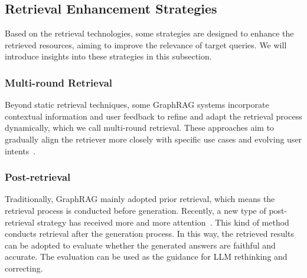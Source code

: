 \documentclass[lettersize,journal]{IEEEtran}
\begin{document}
\subsection{Retrieval Enhancement Strategies}
Based on the retrieval technologies, some strategies are designed to enhance the retrieved resources, aiming to improve the relevance of target queries. We will introduce insights into these strategies in this subsection.

\subsubsection{Multi-round Retrieval} Beyond static retrieval techniques, some GraphRAG systems incorporate contextual information and user feedback to refine and adapt the retrieval process dynamically, which we call multi-round retrieval. These approaches aim to gradually align the retriever more closely with specific use cases and evolving user intents~\cite{park2024generative,jin2024graph,zhang2024graphofrecords}.

\subsubsection{Post-retrieval} Traditionally, GraphRAG mainly adopted prior retrieval, which means the retrieval process is conducted before generation. Recently, a new type of post-retrieval strategy has received more and more attention~\cite{wang2023boosting,guan2024mitigating}. This kind of method conducts retrieval after the generation process. In this way, the retrieved results can be adopted to evaluate whether the generated answers are faithful and accurate. The evaluation can be used as the guidance for LLM rethinking and correcting.
\end{document}
